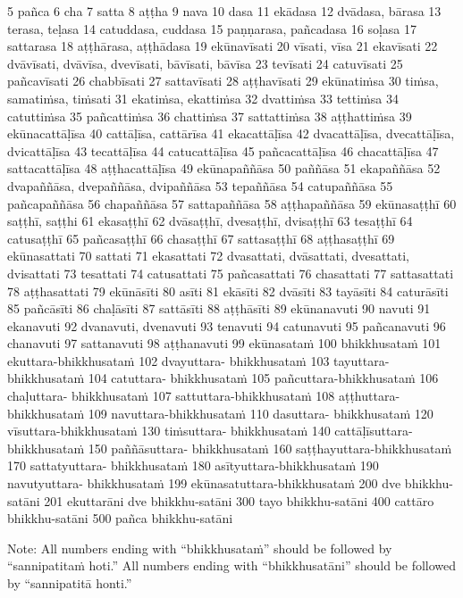 5 pañca 6 cha 7 satta 8 aṭṭha 9 nava 10 dasa 11 ekādasa 12
dvādasa, bārasa 13 terasa, teḷasa 14 catuddasa, cuddasa 15 paṇṇarasa,
pañcadasa 16 soḷasa 17 sattarasa 18 aṭṭhārasa, aṭṭhādasa 19
ekūnavīsati
20 vīsati, vīsa 21 ekavīsati 22 dvāvīsati, dvāvīsa, dvevīsati, bāvīsati,
bāvīsa 23 tevīsati 24 catuvīsati 25 pañcavīsati 26 chabbīsati 27
sattavīsati 28 aṭṭhavīsati 29 ekūnatiṁsa
30 tiṁsa, samatiṁsa, tiṁsati 31 ekatiṁsa, ekattiṁsa 32 dvattiṁsa
33 tettiṁsa 34 catuttiṁsa 35 pañcattiṁsa 36 chattiṁsa 37 sattattiṁsa
38 aṭṭhattiṁsa 39 ekūnacattāḷīsa
40 cattāḷīsa, cattārīsa 41 ekacattāḷīsa 42 dvacattāḷīsa, dvecattāḷīsa,
dvicattāḷīsa 43 tecattāḷīsa 44 catucattāḷīsa 45 pañcacattāḷīsa 46
chacattāḷīsa 47 sattacattāḷīsa 48 aṭṭhacattāḷīsa 49 ekūnapaññāsa
50 paññāsa 51 ekapaññāsa 52 dvapaññāsa, dvepaññāsa, dvipaññāsa
53 tepaññāsa 54 catupaññāsa 55 pañcapaññāsa 56 chapaññāsa 57
sattapaññāsa 58 aṭṭhapaññāsa 59 ekūnasaṭṭhī
60 saṭṭhī, saṭṭhi 61 ekasaṭṭhī 62 dvāsaṭṭhī, dvesaṭṭhī, dvisaṭṭhī 63
tesaṭṭhī 64 catusaṭṭhī 65 pañcasaṭṭhī 66 chasaṭṭhī 67 sattasaṭṭhī 68
aṭṭhasaṭṭhī 69 ekūnasattati
70 sattati 71 ekasattati 72 dvasattati, dvāsattati, dvesattati, dvisattati
73 tesattati 74 catusattati 75 pañcasattati 76 chasattati 77 sattasattati
78 aṭṭhasattati 79 ekūnāsīti
80 asīti 81 ekāsīti 82 dvāsīti 83 tayāsīti 84 caturāsīti 85 pañcāsīti 86
chaḷāsīti 87 sattāsīti 88 aṭṭhāsīti 89 ekūnanavuti
90 navuti 91 ekanavuti 92 dvanavuti, dvenavuti 93 tenavuti 94
catunavuti 95 pañcanavuti 96 chanavuti 97 sattanavuti 98 aṭṭhanavuti
99 ekūnasataṁ
100 bhikkhusataṁ 101 ekuttara-bhikkhusataṁ 102 dvayuttara-
bhikkhusataṁ 103 tayuttara-bhikkhusataṁ 104 catuttara-
bhikkhusataṁ 105 pañcuttara-bhikkhusataṁ 106 chaḷuttara-
bhikkhusataṁ 107 sattuttara-bhikkhusataṁ 108 aṭṭhuttara-
bhikkhusataṁ 109 navuttara-bhikkhusataṁ 110 dasuttara-
bhikkhusataṁ 120 vīsuttara-bhikkhusataṁ 130 tiṁsuttara-
bhikkhusataṁ 140 cattāḷīsuttara-bhikkhusataṁ 150 paññāsuttara-
bhikkhusataṁ 160 saṭṭhayuttara-bhikkhusataṁ 170 sattatyuttara-
bhikkhusataṁ 180 asītyuttara-bhikkhusataṁ 190 navutyuttara-
bhikkhusataṁ 199 ekūnasatuttara-bhikkhusataṁ
200 dve bhikkhu-satāni 201 ekuttarāni dve bhikkhu-satāni
300 tayo bhikkhu-satāni 400 cattāro bhikkhu-satāni 500 pañca
bhikkhu-satāni



Note:
All numbers ending with “bhikkhusataṁ” should be followed by “sannipatitaṁ hoti.”
All numbers ending with “bhikkhusatāni” should be followed by “sannipatitā honti.”